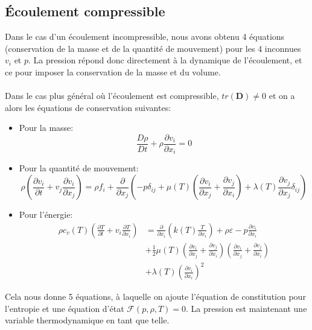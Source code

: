 \subsection{\'Ecoulement compressible}
Dans le cas d'un écoulement incompressible, nous avons obtenu 4 équations (conservation de la masse et de la quantité de mouvement) pour les 4 inconnues $v_i$ et $p$. La pression répond donc directement à la dynamique de l'écoulement, et ce pour imposer la conservation de la masse et du volume.
\paragraph{}
Dans le cas plus général où l'écoulement est compressible, $tr(\textbf{D})\neq 0$ et on a alors les équations de conservation suivantes:
\begin{itemize}
\item Pour la masse: 
	$$\frac{D\rho}{Dt}+\rho\frac{\partial v_i}{\partial x_i}=0$$
\item Pour la quantité de mouvement:
 $$\rho\left(\frac{\partial v_i}{\partial t}+v_j\frac{\partial v_i}{\partial x_j}\right)=\rho f_i+\frac{\partial}{\partial x_j}\left(-p\delta_{ij}+\mu(T)\left(\frac{\partial v_i}{\partial x_j}+\frac{\partial v_j}{\partial x_i}\right)+\lambda(T)\frac{\partial v_j}{\partial x_j}\delta_{ij}\right)$$
\item Pour l'énergie:
\begin{align*}
\rho c_v(T)\left(\frac{\partial T}{\partial t}+v_i\frac{\partial T}{\partial x_i}\right)&=\frac{\partial}{\partial x_i}\left(k(T)\frac{T}{\partial x_i}\right)+\rho\varepsilon-p\frac{\partial v_i}{\partial x_i}\\
 &+\frac{1}{2}\mu(T)\left(\frac{\partial v_i}{\partial x_j}+\frac{\partial v_j}{\partial x_i}\right)\left(\frac{\partial v_i}{\partial x_j}+\frac{\partial v_j}{\partial x_i}\right)\\
 &+\lambda(T)\left(\frac{\partial v_i}{\partial x_i}\right)^2
\end{align*}
\end{itemize}
Cela nous donne 5 équations, à laquelle on ajoute l'équation de constitution pour l'entropie et une équation d'état $\mathcal{F}(p,\rho,T)=0$. La pression est maintenant une variable thermodynamique en tant que telle.

